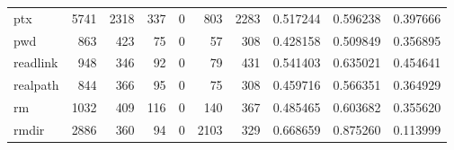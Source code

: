 \begin{longtable}{lrrrrrrrrr}
ptx       &                                               5741 &                                               2318 &                                                337 &                                                  0 &                                                803 &                                               2283 &                                           0.517244 &                               0.596238 &                             0.397666 \\
pwd       &                                                863 &                                                423 &                                                 75 &                                                  0 &                                                 57 &                                                308 &                                           0.428158 &                               0.509849 &                             0.356895 \\
readlink  &                                                948 &                                                346 &                                                 92 &                                                  0 &                                                 79 &                                                431 &                                           0.541403 &                               0.635021 &                             0.454641 \\
realpath  &                                                844 &                                                366 &                                                 95 &                                                  0 &                                                 75 &                                                308 &                                           0.459716 &                               0.566351 &                             0.364929 \\
rm        &                                               1032 &                                                409 &                                                116 &                                                  0 &                                                140 &                                                367 &                                           0.485465 &                               0.603682 &                             0.355620 \\
rmdir     &                                               2886 &                                                360 &                                                 94 &                                                  0 &                                               2103 &                                                329 &                                           0.668659 &                               0.875260 &                             0.113999 \\

\end{longtable}

